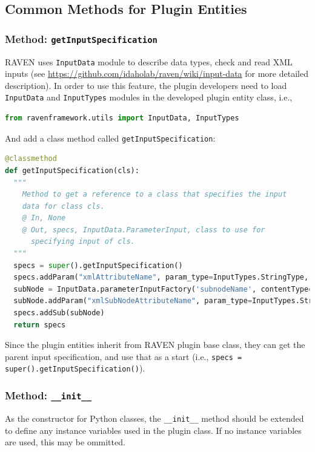 \subsection{Common Methods for Plugin Entities}
\label{subsec:commonMethods}
\subsubsection{Method: \texttt{getInputSpecification}}
\label{subsubsec:getInputSpecification}
RAVEN uses \texttt{InputData} module to describe data types, check and read XML inputs
(see \url{https://github.com/idaholab/raven/wiki/input-data} for more detailed description).
In order to use this feature, the plugin developers need to load \texttt{InputData} and \texttt{InputTypes}
modules in the developed plugin entity class, i.e.,
\begin{lstlisting}[language=python]
from ravenframework.utils import InputData, InputTypes
\end{lstlisting}
And add a class method called \texttt{getInputSpecification}:
\begin{lstlisting}[language=python, basicstyle=\scriptsize\ttfamily, breaklines=True, columns=fullflexible]
@classmethod
def getInputSpecification(cls):
  """
    Method to get a reference to a class that specifies the input
    data for class cls.
    @ In, None
    @ Out, specs, InputData.ParameterInput, class to use for
      specifying input of cls.
  """
  specs = super().getInputSpecification()
  specs.addParam("xmlAttributeName", param_type=InputTypes.StringType, required=True, default='no-default', descr='')
  subNode = InputData.parameterInputFactory('subnodeName', contentType=InputTypes.StringType, default='no-default', decr='')
  subNode.addParam("xmlSubNodeAttributeName", param_type=InputTypes.StringType, required=True, default='no-default', descr='')
  specs.addSub(subNode)
  return specs
\end{lstlisting}
Since the plugin entities inherit from RAVEN plugin base class, they can get the parent input specification, and use
that as a start (i.e., \texttt{specs = super().getInputSpecification()}).

\subsubsection{Method: \texttt{\_\_init\_\_}}
\label{subsubsec:init}
As the constructor for Python classes, the \texttt{\_\_init\_\_} method should be extended to define
any instance variables used in the plugin class. If no instance variables are used, this may be ommitted.

